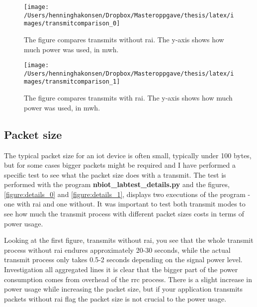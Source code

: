 \documentclass[USenglish]{ifimaster}  %
\begin{document}
\begin{figure}[H]
  \centering\texttt{[image: /Users/henninghakonsen/Dropbox/Masteroppgave/thesis/latex/images/transmitcomparison\_0]}
  \caption[Short-term test - comparison without \acrshort{rai}]{The figure compares transmits without \acrshort{rai}. The y-axis shows how much power was used, in \acrshort{mwh}.}
  \label{figure:transmit_comparison_0}
\end{figure}

\begin{figure}[H]
  \centering\texttt{[image: /Users/henninghakonsen/Dropbox/Masteroppgave/thesis/latex/images/transmitcomparison\_1]}
  \caption[Short-term test - comparison with \acrshort{rai}]{The figure compares transmits with \acrshort{rai}. The y-axis shows how much power was used, in \acrshort{mwh}.}
  \label{figure:transmit_comparison_1}
\end{figure}

\subsection{Packet size} \label{ssection:packetsize}
The typical packet size for an \acrshort{iot} device is often small, typically under 100 bytes, but for some cases bigger packets might be required and I have performed a specific test to see what the packet size does with a transmit. The test is performed with the program \textbf{nbiot\_labtest\_details.py} and the figures, \vref{figure:details_0} and \vref{figure:details_1}, displays two executions of the program - one with \acrshort{rai} and one without. It was important to test both transmit modes to see how much the transmit process with different packet sizes costs in terms of power usage.

Looking at the first figure, transmits without \acrshort{rai}, you see that the whole transmit process without \acrshort{rai} endures approximately 20-30 seconds, while the actual transmit process only takes 0.5-2 seconds depending on the signal power level. Investigation all aggregated lines it is clear that the bigger part of the power consumption comes from overhead of the \acrshort{rrc} process. There is a slight increase in power usage while increasing the packet size, but if your application transmits packets without \acrshort{rai} flag the packet size is not crucial to the power usage.
\end{document}
